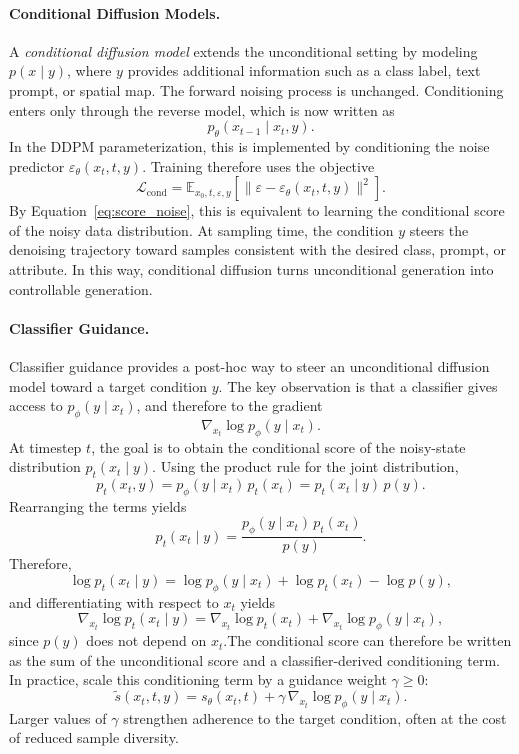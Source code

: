 \paragraph{Conditional Diffusion Models.}
A \textit{conditional diffusion model} extends the unconditional setting by modeling
\(p(x \mid y)\), where \(y\) provides additional information such as a class label, text
prompt, or spatial map. The forward noising process is unchanged. Conditioning enters only
through the reverse model, which is now written as
\[
p_\theta(x_{t-1}\mid x_t,y).
\]
In the DDPM parameterization, this is implemented by conditioning the noise predictor
\(\varepsilon_\theta(x_t,t,y)\). Training therefore uses the objective
\begin{equation}
\mathcal{L}_{\text{cond}}
=
\mathbb{E}_{x_0,t,\varepsilon,y}
\left[
\|\varepsilon-\varepsilon_\theta(x_t,t,y)\|^2
\right].
\end{equation}
By Equation~\ref{eq:score_noise}, this is equivalent to learning the conditional score of
the noisy data distribution. At sampling time, the condition \(y\) steers the denoising
trajectory toward samples consistent with the desired class, prompt, or attribute. In this
way, conditional diffusion turns unconditional generation into controllable generation.

\paragraph{Classifier Guidance.}
Classifier guidance \citep{NEURIPS2021_49ad23d1} provides a post-hoc way to steer an
unconditional diffusion model toward a target condition \(y\). The key observation is that
a classifier gives access to \(p_\phi(y\mid x_t)\), and therefore to the gradient
\[
\nabla_{x_t}\log p_\phi(y\mid x_t).
\]
At timestep \(t\), the goal is to obtain the conditional score of the noisy-state distribution \(p_t(x_t\mid y)\). Using the product rule for the joint distribution,
\[
p_t(x_t,y)=p_\phi(y\mid x_t)\,p_t(x_t)=p_t(x_t\mid y)\,p(y).
\]
Rearranging the terms yields
\[
p_t(x_t\mid y)=\frac{p_\phi(y\mid x_t)\,p_t(x_t)}{p(y)}.
\]
Therefore,
\[
\log p_t(x_t\mid y)
=
\log p_\phi(y\mid x_t)+\log p_t(x_t)-\log p(y),
\]
and differentiating with respect to \(x_t\) yields
\[
\nabla_{x_t}\log p_t(x_t\mid y)
=
\nabla_{x_t}\log p_t(x_t)
+
\nabla_{x_t}\log p_\phi(y\mid x_t),
\]
since \(p(y)\) does not depend on \(x_t\).The conditional score can therefore be written
as the sum of the unconditional score and a classifier-derived conditioning term. In
practice, \citet{NEURIPS2021_49ad23d1} scale this conditioning term by a guidance weight
\(\gamma \ge 0\):
\begin{equation}
\tilde{s}(x_t,t,y)
=
s_\theta(x_t,t)
+
\gamma\,\nabla_{x_t}\log p_\phi(y\mid x_t).
\label{eq:classifier_guidance_scaled}
\end{equation}
Larger values of \(\gamma\) strengthen adherence to the target condition, often at the cost
of reduced sample diversity.

